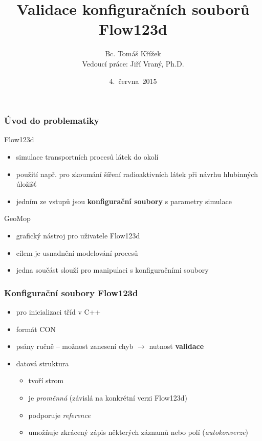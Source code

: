 \documentclass{beamer}
\begin{document}

\title{Validace konfiguračních souborů Flow123d}
\author[Bc. Tomáš Křížek]{{\large Bc. Tomáš Křížek}\\{\scriptsize Vedoucí práce: Jiří Vraný, Ph.D.}}
\date{4.~června~2015}

\begin{frame}
	\titlepage
\end{frame}

\begin{frame}
	\frametitle{Úvod do problematiky}
	\begin{block}{Flow123d}
		\begin{itemize}
			\item simulace transportních procesů látek do okolí
			\item použití např. pro zkoumání šíření radioaktivních látek při návrhu hlubinných úložišť
			\item jedním ze vstupů jsou \textbf{konfigurační soubory} s parametry simulace
		\end{itemize}
	\end{block}

	\begin{block}{GeoMop}
		\begin{itemize}
			\item grafický nástroj pro uživatele Flow123d
			\item cílem je usnadnění modelování procesů
			\item jedna součást slouží pro manipulaci s konfiguračními soubory
		\end{itemize}
	\end{block}
\end{frame}

\begin{frame}
	\frametitle{Konfigurační soubory Flow123d}
	\begin{itemize}
		\item pro inicializaci tříd v C++
		\item formát CON
		\item psány ručně -- možnost zanesení chyb $\rightarrow$ nutnost \textbf{validace}
		\item datová struktura
			\begin{itemize}
				\item tvoří strom
				\item je \textit{proměnná} (závislá na konkrétní verzi Flow123d)
				\item podporuje \textit{reference}
				\item umožňuje zkrácený zápis některých záznamů nebo polí (\textit{autokonverze})
			\end{itemize}
	\end{itemize}
\end{frame}
\end{document}
